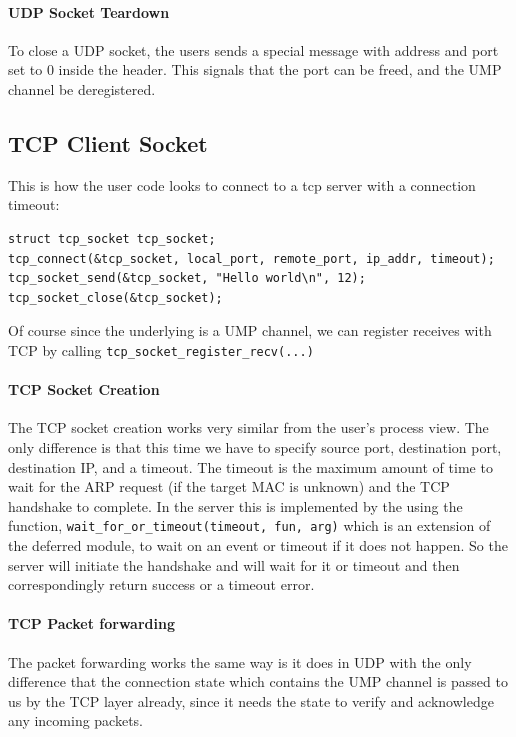 \paragraph{UDP Socket Teardown}
To close a UDP socket, the users sends a special message with address and port set to 0 inside the header. This signals that the port can be freed, and the UMP channel be deregistered.


\subsection{TCP Client Socket}

This is how the user code looks to connect to a tcp server with a connection timeout:
\begin{verbatim}
struct tcp_socket tcp_socket;
tcp_connect(&tcp_socket, local_port, remote_port, ip_addr, timeout);
tcp_socket_send(&tcp_socket, "Hello world\n", 12);
tcp_socket_close(&tcp_socket);
\end{verbatim}
Of course since the underlying is a UMP channel, we can register receives with TCP by calling \texttt{tcp_socket_register_recv(...)}


\paragraph{TCP Socket Creation}

The TCP socket creation works very similar from the user's process view. The only difference is that this time we have to specify source port, destination port, destination IP, and a timeout. The timeout is the maximum amount of time to wait for the ARP request (if the target MAC is unknown) and the TCP handshake to complete. In the server this is implemented by the using the function, \texttt{wait_for_or_timeout(timeout, fun, arg)} which is an extension of the deferred module, to wait on an event or timeout if it does not happen. So the server will initiate the handshake and will wait for it or timeout and then correspondingly return success or a timeout error.

\paragraph{TCP Packet forwarding}
The packet forwarding works the same way is it does in UDP with the only difference that the connection state which contains the UMP channel is passed to us by the TCP layer already, since it needs the state to verify and acknowledge any incoming packets.

